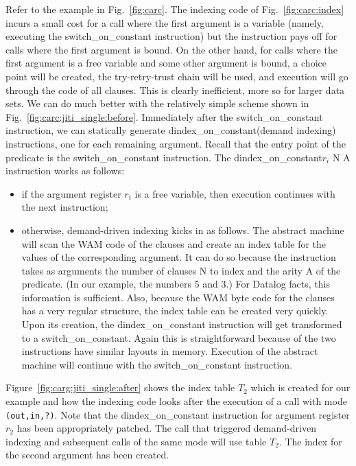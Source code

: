 \documentclass{llncs}
\newcommand{\code}[1]{\texttt{#1}}
\newcommand{\instr}[1]{\textsf{#1}}
\newcommand{\TryRetryTrust}{\mbox{\instr{try-retry-trust}}\xspace}
\newcommand{\jitiONconstant}{\mbox{\instr{dindex\_on\_constant}}\xspace}
\newcommand{\switchONconstant}{\mbox{\instr{switch\_on\_constant}}\xspace}
\newcommand{\JITI}{demand-driven indexing\xspace}
\begin{document}
Refer to the example in Fig.~\ref{fig:carc}.
%
The indexing code of Fig.~\ref{fig:carc:index} incurs a small cost for
a call where the first argument is a variable (namely, executing the
\switchONconstant instruction) but the instruction pays off for calls
where the first argument is bound. On the other hand, for calls where
the first argument is a free variable and some other argument is
bound, a choice point will be created, the \TryRetryTrust chain will
be used, and execution will go through the code of all clauses. This
is clearly inefficient, more so for larger data sets.
%
We can do much better with the relatively simple scheme shown in
Fig.~\ref{fig:carc:jiti_single:before}. Immediately after the
\switchONconstant instruction, we can statically generate
\jitiONconstant (demand indexing) instructions, one for each remaining
argument. Recall that the entry point of the predicate is the
\switchONconstant instruction. The \jitiONconstant $r_i$ \instr{N A}
instruction works as follows:
\begin{itemize}
\item if the argument register $r_i$ is a free variable, then
  execution continues with the next instruction;
\item otherwise, \JITI kicks in as follows. The abstract machine will
  scan the WAM code of the clauses and create an index table for the
  values of the corresponding argument. It can do so because the
  instruction takes as arguments the number of clauses \instr{N} to
  index and the arity \instr{A} of the predicate. (In our example, the
  numbers 5 and 3.) For Datalog facts, this information is sufficient.
  Also, because the WAM byte code for the clauses has a very regular
  structure, the index table can be created very quickly. Upon its
  creation, the \jitiONconstant instruction will get transformed to a
  \switchONconstant. Again this is straightforward because of the two
  instructions have similar layouts in memory. Execution of the
  abstract machine will continue with the \switchONconstant
  instruction.
\end{itemize}
Figure~\ref{fig:carg:jiti_single:after} shows the index table $T_2$
which is created for our example and how the indexing code looks after
the execution of a call with mode \code{(out,in,?)}. Note that the
\jitiONconstant instruction for argument register $r_2$ has been
appropriately patched. The call that triggered \JITI and subsequent
calls of the same mode will use table $T_2$. The index for the second
argument has been created.
\end{document}
